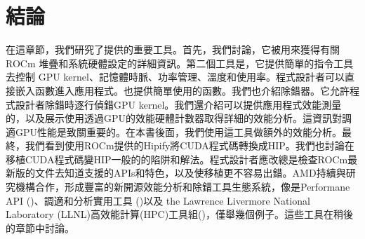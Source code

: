 \section{結論}

在這章節，我們研究了提供的重要工具。首先，我們討論，它被用來獲得有關 ROCm 堆疊和系統硬體設定的詳細資訊。第二個工具是，它提供簡單的指令工具去控制 GPU kernel、記憶體時脈、功率管理、溫度和使用率。程式設計者可以直接嵌入函數進入應用程式。也提供簡單使用的函數。我們也介紹除錯器。它允許程式設計者除錯時逐行偵錯GPU kernel。我們還介紹可以提供應用程式效能測量的，以及展示使用透過GPU的效能硬體計數器取得詳細的效能分析。這資訊對調適GPU性能是致關重要的。在本書後面，我們使用這工具做額外的效能分析。最終，我們看到使用ROCm提供的Hipify將CUDA程式碼轉換成HIP。我們也討論在移植CUDA程式碼變HIP一般的的陷阱和解法。程式設計者應改總是檢查ROCm最新版的文件去知道支援的APIs和特色，以及使移植更不容易出錯。AMD持續與研究機構合作，形成豐富的新開源效能分析和除錯工具生態系統，像是Performane API ()、調適和分析實用工具 ()以及 the Lawrence Livermore National Laboratory (LLNL)高效能計算(HPC)工具組()，僅舉幾個例子。這些工具在稍後的章節中討論。